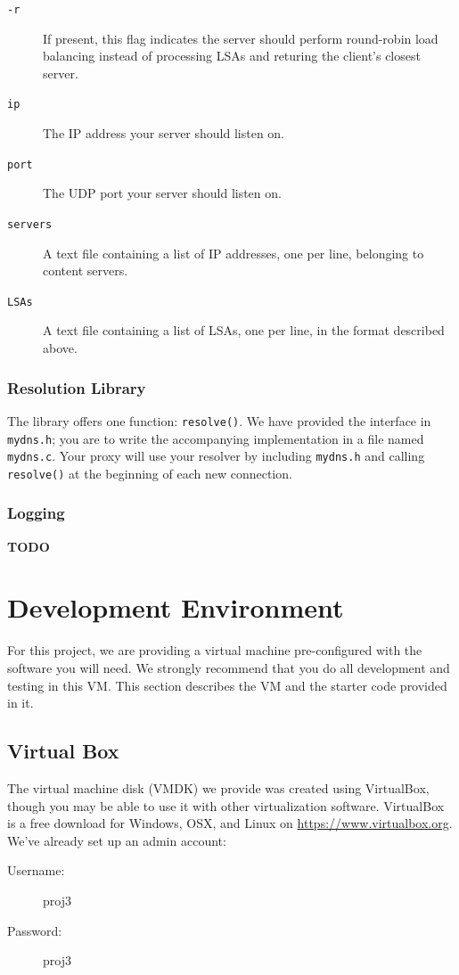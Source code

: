 \documentclass{article}
\begin{document}
\begin{description}
	\item[\texttt{-r}] If present, this flag indicates the server should
	perform round-robin load balancing instead of processing LSAs and returing
	the client's closest server.
	\item[\texttt{ip}] The IP address your server should listen on.
	\item[\texttt{port}] The UDP port your server should listen on.
	\item[\texttt{servers}] A text file containing a list of IP addresses, one
	per line, belonging to content servers.
	\item[\texttt{LSAs}] A text file containing a list of LSAs, one per line,
	in the format described above.
\end{description}


\subsubsection{Resolution Library}
The library offers one function: \texttt{resolve()}. We have provided the
interface in \texttt{mydns.h}; you are to write the accompanying implementation
in a file named \texttt{mydns.c}. Your proxy will use your resolver by
including \texttt{mydns.h} and calling \texttt{resolve()} at the beginning of
each new connection.


\subsubsection{Logging}

\textbf{TODO}


\section{Development Environment}
\label{sec:starter}

For this project, we are providing a virtual machine pre-configured with the
software you will need. We strongly recommend that you do all development and
testing in this VM. This section describes the VM and the starter code provided
in it.

\subsection{Virtual Box}

The virtual machine disk (VMDK) we provide was created using VirtualBox, though
you may be able to use it with other virtualization software. VirtualBox is a
free download for Windows, OSX, and Linux on \url{https://www.virtualbox.org}.
We've already set up an admin account:
\begin{description}
	\item[Username:] proj3
	\item[Password:] proj3
\end{description}
\end{document}
